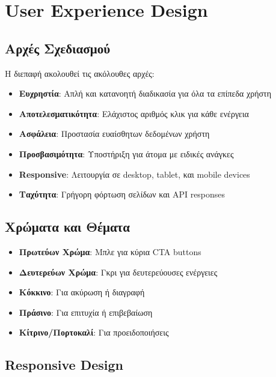 \documentclass[12pt,a4paper]{report}
\begin{document}
\newpage

\section{User Experience Design}

\subsection{Αρχές Σχεδιασμού}

Η διεπαφή ακολουθεί τις ακόλουθες αρχές:

\begin{itemize}
    \item \textbf{Ευχρηστία}: Απλή και κατανοητή διαδικασία για όλα τα επίπεδα χρήστη
    \item \textbf{Αποτελεσματικότητα}: Ελάχιστος αριθμός κλικ για κάθε ενέργεια
    \item \textbf{Ασφάλεια}: Προστασία ευαίσθητων δεδομένων χρήστη
    \item \textbf{Προσβασιμότητα}: Υποστήριξη για άτομα με ειδικές ανάγκες
    \item \textbf{Responsive}: Λειτουργία σε desktop, tablet, και mobile devices
    \item \textbf{Ταχύτητα}: Γρήγορη φόρτωση σελίδων και API responses
\end{itemize}

\subsection{Χρώματα και Θέματα}

\begin{itemize}
    \item \textbf{Πρωτεύων Χρώμα}: Μπλε για κύρια CTA buttons
    \item \textbf{Δευτερεύων Χρώμα}: Γκρι για δευτερεύουσες ενέργειες
    \item \textbf{Κόκκινο}: Για ακύρωση ή διαγραφή
    \item \textbf{Πράσινο}: Για επιτυχία ή επιβεβαίωση
    \item \textbf{Κίτρινο/Πορτοκαλί}: Για προειδοποιήσεις
\end{itemize}

\subsection{Responsive Design}
\end{document}
